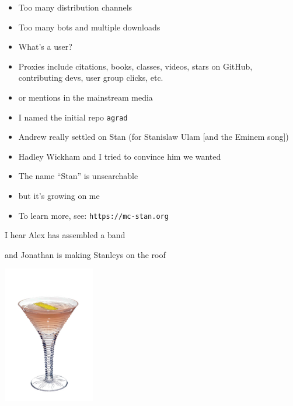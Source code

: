 \documentclass[9pt]{report}
\begin{document}
\begin{itemize}
\item Too many distribution channels
\item Too many bots and multiple downloads
\item What's a user?
\item Proxies include citations, books, classes, videos, stars on GitHub,
  contributing devs, user group clicks, etc. 
\item or mentions in the mainstream media
\end{itemize}

\begin{itemize}
\item I named the initial repo \texttt{agrad}
\item Andrew really settled on Stan (for Stanislaw Ulam [and the Eminem song])
\item Hadley Wickham and I tried to convince him we wanted
\item The name ``Stan'' is unsearchable
\item but it's growing on me
\end{itemize}

\begin{itemize}
  \item To learn more, see: \texttt{https://mc-stan.org}
  \end{itemize}
  
\begin{subitemize}
\item I hear Alex has assembled a band
\item and Jonathan is making Stanleys on the roof
\end{subitemize}
\begin{center}
  \includegraphics[width=0.3\textwidth]{img/stanley.jpeg}
\end{center}
\end{document}
